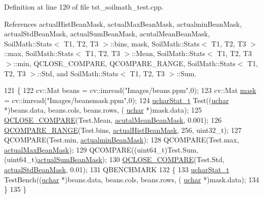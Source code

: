 Definition at line 120 of file tst\+\_\+soilmath\+\_\+test.\+cpp.



References actual\+Hist\+Bean\+Mask, actual\+Max\+Bean\+Mask, actualmin\+Bean\+Mask, actual\+Std\+Bean\+Mask, actual\+Sum\+Bean\+Mask, acutal\+Mean\+Bean\+Mask, Soil\+Math\+::\+Stats$<$ T1, T2, T3 $>$\+::bins, mask, Soil\+Math\+::\+Stats$<$ T1, T2, T3 $>$\+::max, Soil\+Math\+::\+Stats$<$ T1, T2, T3 $>$\+::\+Mean, Soil\+Math\+::\+Stats$<$ T1, T2, T3 $>$\+::min, Q\+C\+L\+O\+S\+E\+\_\+\+C\+O\+M\+P\+A\+R\+E, Q\+C\+O\+M\+P\+A\+R\+E\+\_\+\+R\+A\+N\+G\+E, Soil\+Math\+::\+Stats$<$ T1, T2, T3 $>$\+::\+Std, and Soil\+Math\+::\+Stats$<$ T1, T2, T3 $>$\+::\+Sum.


\begin{DoxyCode}
121 \{
122     cv::Mat beans = cv::imread(\textcolor{stringliteral}{"Images/beans.ppm"},0);
123     cv::Mat \hyperlink{_gen_blob_8m_a5d76cc2129e79ba1941d2cc2f53b9e8e}{mask} = cv::imread(\textcolor{stringliteral}{"Images/beansmask.ppm"},0);
124     \hyperlink{class_soil_math_1_1_stats}{ucharStat\_t} Test((\hyperlink{_soil_math_types_8h_a65f85814a8290f9797005d3b28e7e5fc}{uchar} *)beans.data, beans.cols, beans.rows, (
      \hyperlink{_soil_math_types_8h_a65f85814a8290f9797005d3b28e7e5fc}{uchar} *)mask.data);
125     \hyperlink{tst__soilmath__test_8cpp_a8a8e087bc3a2f5ca88371122b7c8e9cc}{QCLOSE\_COMPARE}(Test.Mean, \hyperlink{beanhisttest_8h_a8a6727317fd8384c82a8215fdf292073}{acutalMeanBeanMask}, 0.001);
126     \hyperlink{tst__soilmath__test_8cpp_a72a3de1ae27adae72631c94b1eaaea56}{QCOMPARE\_RANGE}(Test.bins, \hyperlink{beanhisttest_8h_aa70a1287fa02b7677d9a2dd5377f9933}{actualHistBeanMask}, 256, uint32\_t);
127     QCOMPARE(Test.min, \hyperlink{beanhisttest_8h_abd380182491950c1e704def6fab34c21}{actualminBeanMask});
128     QCOMPARE(Test.max, \hyperlink{beanhisttest_8h_a354ff38fb7fc4f471e9c3247213b7ec7}{actualMaxBeanMask});
129     QCOMPARE((uint64\_t)Test.Sum, (uint64\_t)\hyperlink{beanhisttest_8h_af00b8daba38848258fa94b96a45308f2}{actualSumBeanMask});
130     \hyperlink{tst__soilmath__test_8cpp_a8a8e087bc3a2f5ca88371122b7c8e9cc}{QCLOSE\_COMPARE}(Test.Std, \hyperlink{beanhisttest_8h_a8fde1bc8cc700165840fe6f4aad2e18a}{actualStdBeanMask}, 0.01);
131     QBENCHMARK
132     \{
133         \hyperlink{class_soil_math_1_1_stats}{ucharStat\_t} TestBench((\hyperlink{_soil_math_types_8h_a65f85814a8290f9797005d3b28e7e5fc}{uchar} *)beans.data, beans.cols, beans.rows, (
      \hyperlink{_soil_math_types_8h_a65f85814a8290f9797005d3b28e7e5fc}{uchar} *)mask.data);
134     \}
135 \}
\end{DoxyCode}
\hypertarget{class_soil_math___test_aca4ac3b1b8790bd74559e880522559c4}{}
